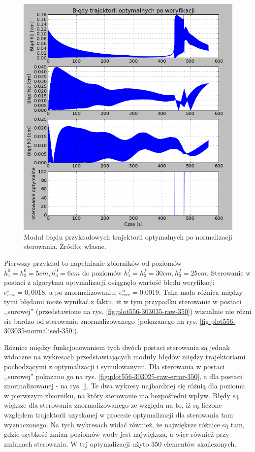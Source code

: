 \begin{figure}
    \centering
    \includegraphics{Grafika/plot_5_5_6-30_30_25-normalised-error-350}
    \caption{Moduł błędu przykładowych trajektorii optymalnych po normalizacji sterowania. Źródło: własne.}
    \label{fig:plot556-303025-normalised-error-350}
\end{figure}


Pierwszy przykład to napełnianie zbiorników od poziomów $h_{1}^{0} = h_{2}^{0} = 5 cm, h_{3}^{0} = 6 cm$ do poziomów $h_{1}^{f} = h_{2}^{f} = 30 cm, h_{3}^{f} = 25 cm$. Sterowanie w postaci z algorytmu optymalizacji osiągnęło wartość błędu weryfikacji $e_{wer}^{s} = 0,0018$, a po znormalizowaniu: $e_{wer}^{n} = 0.0019$. Taka mała różnica między tymi błędami może wynikać z faktu, iż w tym przypadku sterowanie w postaci ,,surowej'' (przedstawione na rys. \ref{fig:plot556-303035-raw-350}) wizualnie nie różni się bardzo od sterowania znormalizowanego (pokazanego na rys. \ref{fig:plot556-303035-normalised-350}).

Różnice między funkcjonowaniem tych dwóch postaci sterowania są jednak widoczne na wykresach przedstawiających moduły błędów między trajektoriami pochodzącymi z optymalizacji i symulowanymi. Dla sterowania w postaci ,,surowej'' pokazano go na rys. \ref{fig:plot556-303025-raw-error-350}, a dla postaci znormalizowanej - na rys. \ref{fig:plot556-303025-normalised-error-350}. Te dwa wykresy najbardziej się różnią dla poziomu w pierwszym zbiorniku, na który sterowanie ma bezpośredni wpływ. Błędy są większe dla sterowania znormalizowanego ze względu na to, iż są liczone względem trajektorii uzyskanej w procesie optymalizacji dla sterowania tam wyznaczonego. Na tych wykresach widać również, że największe różnice są tam, gdzie szybkość zmian poziomów wody jest największa, a więc również przy zmianach sterowania.
W tej optymalizacji użyto 350 elementów skończonych.

